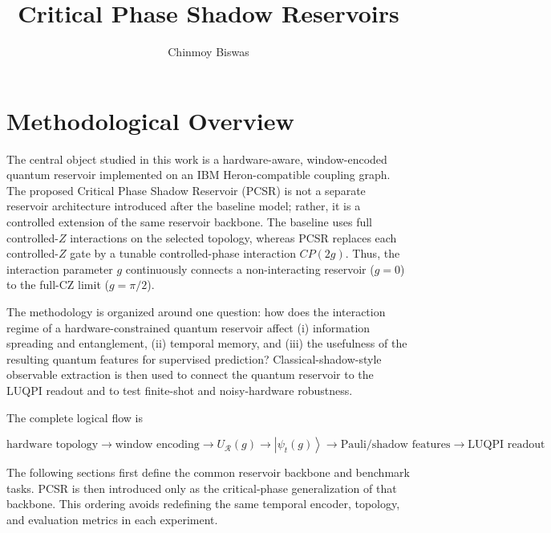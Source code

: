 \documentclass[final,1p,times]{elsarticle}
\newcommand{\ket}[1]{\left|#1\right\rangle}
\begin{document}
\begin{frontmatter}

\title{Critical Phase Shadow Reservoirs}

\author{Chinmoy Biswas}

\end{frontmatter}

\section{Methodological Overview}
\label{sec:overview}

The central object studied in this work is a hardware-aware,
window-encoded quantum reservoir implemented on an IBM Heron-compatible
coupling graph. The proposed Critical Phase Shadow Reservoir (PCSR) is
not a separate reservoir architecture introduced after the baseline
model; rather, it is a controlled extension of the same reservoir
backbone. The baseline uses full controlled-$Z$ interactions on the
selected topology, whereas PCSR replaces each controlled-$Z$ gate by a
tunable controlled-phase interaction $CP(2g)$. Thus, the interaction
parameter $g$ continuously connects a non-interacting reservoir
($g=0$) to the full-CZ limit ($g=\pi/2$).

The methodology is organized around one question: how does the
interaction regime of a hardware-constrained quantum reservoir affect
(i) information spreading and entanglement, (ii) temporal memory, and
(iii) the usefulness of the resulting quantum features for supervised
prediction? Classical-shadow-style observable extraction is then used
to connect the quantum reservoir to the LUQPI readout and to test
finite-shot and noisy-hardware robustness.

The complete logical flow is

\begin{equation}
\boxed{
\text{hardware topology}
\rightarrow
\text{window encoding}
\rightarrow
U_{\mathcal R}(g)
\rightarrow
\ket{\psi_t(g)}
\rightarrow
\text{Pauli/shadow features}
\rightarrow
\text{LUQPI readout}
}
\label{eq:main_pipeline}
\end{equation}

The following sections first define the common reservoir backbone and
benchmark tasks. PCSR is then introduced only as the critical-phase
generalization of that backbone. This ordering avoids redefining the
same temporal encoder, topology, and evaluation metrics in each
experiment.
\end{document}
